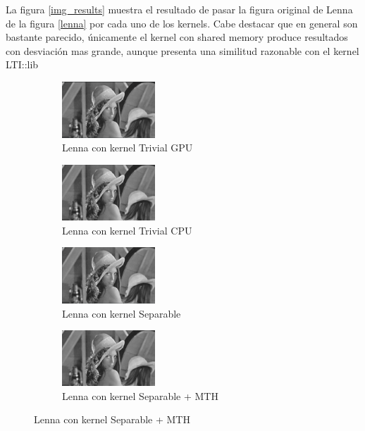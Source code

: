 \documentclass[conference]{IEEEtran}
\begin{document}
La figura \ref{img_results} muestra el resultado de pasar la figura original de Lenna de la figura \ref{lenna} por cada uno de los kernels. Cabe destacar que en general son bastante parecido, únicamente el kernel con shared memory produce resultados con desviación mas grande, aunque presenta una similitud razonable con el kernel LTI::lib

\begin{figure}[H]
  \begin{subfigure}[b]{0.2\textwidth}
    \centering\includegraphics[width=3.5cm]{lenna_gpu}
    \caption{Lenna con kernel Trivial GPU}
  \end{subfigure}
  \begin{subfigure}[b]{0.2\textwidth}
    \centering\includegraphics[width=3.5cm]{lenna_cpu}
    \caption{Lenna con kernel Trivial CPU}
  \end{subfigure}
 
  \begin{subfigure}[b]{0.2\textwidth}
    \centering\includegraphics[width=3.5cm]{lenna_separable}
    \caption{Lenna con kernel Separable}
  \end{subfigure}
  \begin{subfigure}[b]{0.2\textwidth}
    \centering\includegraphics[width=3.5cm]{lenna_mth}
    \caption{Lenna con kernel Separable + MTH}
  \end{subfigure}
  

\end{figure}
\end{document}
